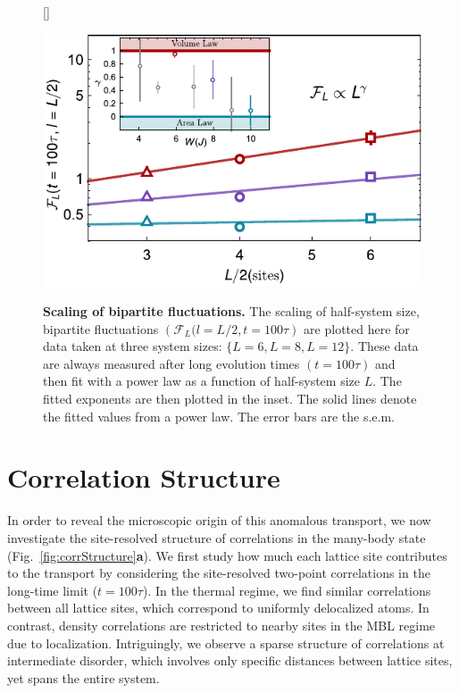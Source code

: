 \begin{figure}[t!]
[\FBwidth]
{\caption{\textbf{Scaling of bipartite fluctuations.} The scaling of half-system size, bipartite fluctuations $\left (\mathcal{F}_L(l=L/2,t=100\tau \right)$ are plotted here for data taken at three system sizes: $\{ L=6, L=8, L=12\}$. These data are always measured after long evolution times $(t=100\tau)$ and then fit with a power law as a function of half-system size $L$. The fitted exponents are then plotted in the inset. The solid lines denote the fitted values from a power law. The error bars are the s.e.m.} \label{fig:bpF}}
{\includegraphics[width=3.6 in]{figures/ch6/combo_fluc.pdf} } 
\end{figure}

\section{Correlation Structure}

In order to reveal the microscopic origin of this anomalous transport, we now investigate the site-resolved structure of correlations in the many-body state (Fig.~\ref{fig:corrStructure}\textbf{a}). We first study how much each lattice site contributes to the transport by considering the site-resolved two-point correlations in the long-time limit ($t=100 \tau$). In the thermal regime, we find similar correlations between all lattice sites, which correspond to uniformly delocalized atoms. In contrast, density correlations are restricted to nearby sites in the MBL regime due to localization. Intriguingly, we observe a sparse structure of correlations at intermediate disorder, which involves only specific distances between lattice sites, yet spans the entire system.

